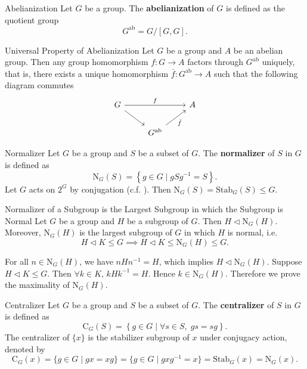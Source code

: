 \begin{definition}{Abelianization}{}
    Let $G$ be a group. The \textbf{abelianization} of $G$ is defined as the quotient group
    $$
        G^{\mathrm{ab}}=G/[G,G].
    $$
\end{definition}

\begin{proposition}{Universal Property of Abelianization}{}
    Let $G$ be a group and $A$ be an abelian group. Then any group homomorphism $f:G\to A$ factors through $G^{\mathrm{ab}}$ uniquely, that is, there exists a unique homomorphism $\bar{f}:G^{\mathrm{ab}}\to A$ such that the following diagram commutes
    $$
        \begin{tikzcd}[ampersand replacement=\&]
            G \arrow[rr, "f"] \arrow[rd] \&  \& A \\
            \& G^{\mathrm{ab}} \arrow[ru, "\bar{f}"'] \&
        \end{tikzcd}
    $$
\end{proposition}

\begin{definition}{Normalizer}{}
    Let $G$ be a group and $S$ be a subset of $G$. The \textbf{normalizer} of $S$ in $G$ is defined as
    $$
        \mathrm{N}_G(S)=\left\{ g\in G\mid gSg^{-1}=S \right\}.
    $$
    Let $G$ acts on $2^G$ by conjugation (c.f. ). Then $\mathrm{N}_G(S)=\mathrm{Stab}_G(S)\le G$.
\end{definition}

\begin{proposition}{Normalizer of a Subgroup is the Largest Subgroup in which the Subgroup is Normal}{}
    Let $G$ be a group and $H$ be a subgroup of $G$. Then $H\lhd\mathrm{N}_G(H)$. Moreover, $\mathrm{N}_G(H)$ is the largest subgroup of $G$ in which $H$ is normal, i.e. $$H\lhd K\le G\implies H\lhd K\le \mathrm{N}_G(H)\le G.$$
\end{proposition}

\begin{prf}
    For all $n\in \mathrm{N}_G(H)$, we have $nHn^{-1}=H$, which implies $H \lhd \mathrm{N}_G(H)$. Suppose $H\lhd K\le G$. Then $\forall k\in K$, $kHk^{-1}=H$. Hence $k\in \mathrm{N}_G(H)$. Therefore we prove the maximality of $\mathrm{N}_G(H)$.
\end{prf}

\begin{definition}{Centralizer}{}
    Let $G$ be a group and $S$ be a subset of $G$. The \textbf{centralizer} of $S$ in $G$ is defined as
    \[
        \mathrm{C}_G(S)=\left\{g\in G\mid  \forall s\in S,\;gs=sg\right\}.
    \]
    The centralizer of $\{x\}$ is the stabilizer subgroup of $x$ under conjugacy action, denoted by
    \[
        \mathrm{C}_G(x)=\{ g\in G\mid gx=xg \}=\{ g\in G\mid gxg^{-1}=x \}= \mathrm{Stab}_G(x)=\mathrm{N}_G(x).
    \]

\end{definition}



